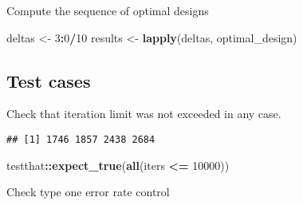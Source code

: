 \documentclass[]{book}
\newenvironment{Shaded}{\begin{snugshade}}{\end{snugshade}}
\newcommand{\ControlFlowTok}[1]{\textcolor[rgb]{0.13,0.29,0.53}{\textbf{#1}}}
\newcommand{\DataTypeTok}[1]{\textcolor[rgb]{0.13,0.29,0.53}{#1}}
\newcommand{\DecValTok}[1]{\textcolor[rgb]{0.00,0.00,0.81}{#1}}
\newcommand{\FloatTok}[1]{\textcolor[rgb]{0.00,0.00,0.81}{#1}}
\newcommand{\KeywordTok}[1]{\textcolor[rgb]{0.13,0.29,0.53}{\textbf{#1}}}
\newcommand{\NormalTok}[1]{#1}
\newcommand{\OperatorTok}[1]{\textcolor[rgb]{0.81,0.36,0.00}{\textbf{#1}}}
\newcommand{\StringTok}[1]{\textcolor[rgb]{0.31,0.60,0.02}{#1}}
\begin{document}
Compute the sequence of optimal designs

\begin{Shaded}
\begin{Highlighting}[]
\NormalTok{deltas  <-}\StringTok{ }\DecValTok{3}\OperatorTok{:}\DecValTok{0}\OperatorTok{/}\DecValTok{10}
\NormalTok{results <-}\StringTok{ }\KeywordTok{lapply}\NormalTok{(deltas, optimal_design)}
\end{Highlighting}
\end{Shaded}

\hypertarget{test-cases-6}{%
\subsection{Test cases}\label{test-cases-6}}

Check that iteration limit was not exceeded in any case.

\begin{Shaded}
\end{Shaded}

\begin{verbatim}
## [1] 1746 1857 2438 2684
\end{verbatim}

\begin{Shaded}
\begin{Highlighting}[]
\NormalTok{testthat}\OperatorTok{::}\KeywordTok{expect_true}\NormalTok{(}\KeywordTok{all}\NormalTok{(iters }\OperatorTok{<=}\StringTok{ }\DecValTok{10000}\NormalTok{))}
\end{Highlighting}
\end{Shaded}

Check type one error rate control

\begin{Shaded}
\end{Shaded}
\end{document}
